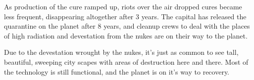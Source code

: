 As production of the cure ramped up, riots over the air dropped cures became
less frequent, disappearing altogether after 3 years. The capital has released
the quarantine on the planet after 8 years, and cleanup crews to deal with the
places of high radiation and devestation from the nukes are on their way to the
planet.

Due to the devestation wrought by the nukes, it's just as common to see tall,
beautiful, sweeping city scapes with areas of destruction here and there. Most
of the technology is still functional, and the planet is on it's way to
recovery.
